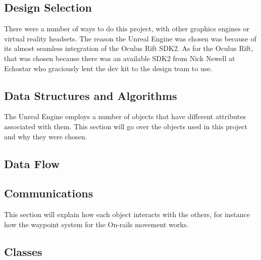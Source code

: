  
 \subsection{Design Selection}
 There were a number of ways to do this project, with other graphics engines or virtual reality headsets.  The reason the Unreal Engine was chosen was because of its almost seamless integration of the Oculus Rift SDK2.  As for the Oculus Rift, that was chosen because there was an available SDK2 from Nick Newell at Echostar who graciously lent the dev kit to the design team to use.  
 
 \subsection{Data Structures and Algorithms}
 The Unreal Engine employs a number of objects that have different attributes associated with them. This section will go over the objects used in this project and why they were chosen.
 
  
 \subsection{Data Flow}
  
 
 \subsection{Communications}
 This section will explain how each object interacts with the others, for instance how the waypoint system for the On-rails movement works. 
 
 \subsection{Classes}
 
 
 

